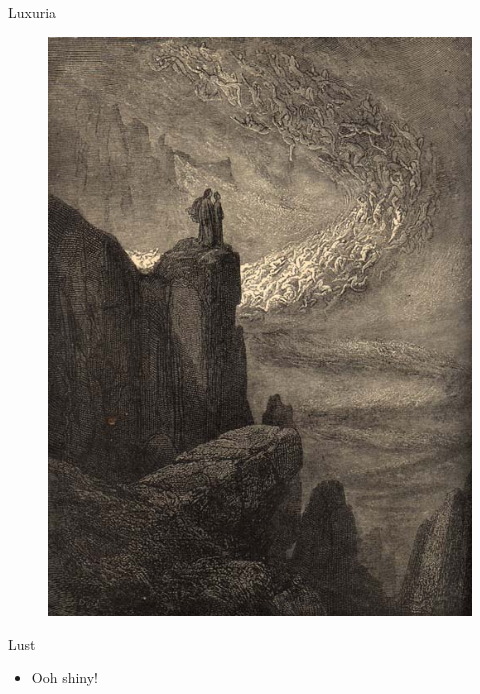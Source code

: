 \documentclass[12pt,xcolor=x11names]{beamer}
\begin{document}
\begin{frame}{Luxuria}
    \begin{figure}
        \centering \includegraphics[height=0.75\textheight]{lust.jpg}
    \end{figure}
\end{frame}
\begin{frame}{Lust}
    \begin{itemize}
        \item Ooh shiny!
    \end{itemize}
\end{frame}
\end{document}
